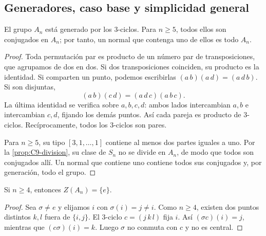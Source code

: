 \subsection{Generadores, caso base y simplicidad general}
\begin{lema}\label{lema:C9-tres-ciclos}
El grupo $A_n$ está generado por los $3$-ciclos. Para $n\ge5$, todos ellos son conjugados en $A_n$; por tanto, un normal que contenga uno de ellos es todo $A_n$.
\end{lema}
\begin{proof}
Toda permutación par es producto de un número par de transposiciones, que agrupamos de dos en dos. Si dos transposiciones coinciden, su producto es la identidad. Si comparten un punto, podemos escribirlas $(a\,b)(a\,d)=(a\,d\,b)$. Si son disjuntas,
\[
(a\,b)(c\,d)=(a\,d\,c)(a\,b\,c).
\]
La última identidad se verifica sobre $a,b,c,d$: ambos lados intercambian $a,b$ e intercambian $c,d$, fijando los demás puntos. Así cada pareja es producto de $3$-ciclos. Recíprocamente, todos los $3$-ciclos son pares.

Para $n\ge5$, su tipo $[3,1,\ldots,1]$ contiene al menos dos partes iguales a uno. Por la \cref{prop:C9-division}, su clase de $S_n$ no se divide en $A_n$, de modo que todos son conjugados allí. Un normal que contiene uno contiene todos sus conjugados y, por generación, todo el grupo.
\end{proof}

\begin{lema}\label{lema:C9-centro}
Si $n\ge4$, entonces $Z(A_n)=\{e\}$.
\end{lema}
\begin{proof}
Sea $\sigma\ne e$ y elijamos $i$ con $\sigma(i)=j\ne i$. Como $n\ge4$, existen dos puntos distintos $k,l$ fuera de $\{i,j\}$. El $3$-ciclo $c=(j\,k\,l)$ fija $i$. Así $(\sigma c)(i)=j$, mientras que $(c\sigma)(i)=k$. Luego $\sigma$ no conmuta con $c$ y no es central.
\end{proof}

